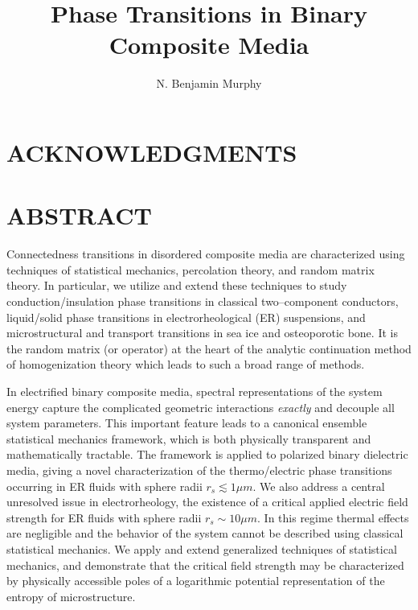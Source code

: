 \documentclass[english,12pt]{ttuthes}
\begin{document}
\title{Phase Transitions in Binary Composite Media} 
\author{N. Benjamin Murphy}

\maketitle

\frontmatter
\chapter{ACKNOWLEDGMENTS}



\tableofcontents

\chapter{ABSTRACT}
Connectedness transitions in disordered composite media are
characterized using techniques of statistical mechanics, percolation
theory, and random matrix theory. In particular, we utilize and extend
these techniques to study conduction/insulation phase transitions in
classical two--component conductors, liquid/solid phase transitions in
electrorheological (ER) suspensions, and microstructural and transport
transitions in sea ice and osteoporotic bone. It is the
random matrix (or operator) at the heart of the analytic continuation
method of homogenization theory which leads to such a broad range of
methods. 

In electrified binary composite media, spectral representations of the
system energy capture the complicated geometric interactions
\emph{exactly} and decouple all system parameters. This important
feature leads to a canonical ensemble statistical mechanics framework,
which is both physically transparent and 
mathematically tractable. The framework is applied to polarized binary
dielectric media, giving a novel characterization of the
thermo/electric phase transitions occurring in ER fluids with sphere
radii $r_s\lesssim1\mu m$. We also address a central unresolved issue in
electrorheology, the existence of a critical applied electric field
strength for ER fluids with sphere radii $r_s\sim10\mu m$. In this regime
thermal effects are negligible and the behavior of the system cannot
be described using classical statistical mechanics. We apply and
extend generalized techniques of statistical mechanics, and
demonstrate that the critical field strength may be characterized by
physically accessible poles of a logarithmic potential representation
of the entropy of microstructure.   
\end{document}
